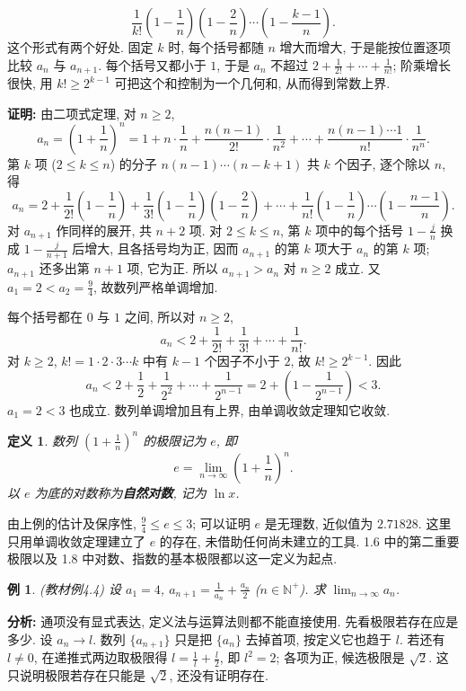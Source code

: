 \documentclass[UTF8,openany]{ctexbook}
\theoremstyle{chinesetextbook}
\newtheorem{definition}{定义}[section]
\newtheorem{example}{例}[section]
\newenvironment{cnproof}{\par\indent\textbf{证明:} \ignorespaces}{\par}
\begin{document}
\[
\frac1{k!}\left(1-\frac1n\right)\left(1-\frac2n\right)\cdots\left(1-\frac{k-1}n\right).
\]
这个形式有两个好处. 固定 $k$ 时, 每个括号都随 $n$ 增大而增大, 于是能按位置逐项比较 $a_n$ 与 $a_{n+1}$. 每个括号又都小于 $1$, 于是 $a_n$ 不超过 $\displaystyle2+\frac1{2!}+\cdots+\frac1{n!}$; 阶乘增长很快, 用 $k!\ge2^{k-1}$ 可把这个和控制为一个几何和, 从而得到常数上界.
\begin{cnproof}
由二项式定理, 对 $n\ge2$,
\[
a_n=\left(1+\frac1n\right)^n
=1+n\cdot\frac1n+\frac{n(n-1)}{2!}\cdot\frac1{n^2}+\cdots+\frac{n(n-1)\cdots1}{n!}\cdot\frac1{n^n}.
\]
第 $k$ 项 ($2\le k\le n$) 的分子 $n(n-1)\cdots(n-k+1)$ 共 $k$ 个因子, 逐个除以 $n$, 得
\[
a_n=2+\frac1{2!}\left(1-\frac1n\right)
+\frac1{3!}\left(1-\frac1n\right)\left(1-\frac2n\right)
+\cdots+\frac1{n!}\left(1-\frac1n\right)\cdots\left(1-\frac{n-1}n\right).
\]
对 $a_{n+1}$ 作同样的展开, 共 $n+2$ 项. 对 $2\le k\le n$, 第 $k$ 项中的每个括号 $\displaystyle1-\frac jn$ 换成 $\displaystyle1-\frac j{n+1}$ 后增大, 且各括号均为正, 因而 $a_{n+1}$ 的第 $k$ 项大于 $a_n$ 的第 $k$ 项; $a_{n+1}$ 还多出第 $n+1$ 项, 它为正. 所以 $a_{n+1}>a_n$ 对 $n\ge2$ 成立. 又 $\displaystyle a_1=2<a_2=\frac94$, 故数列严格单调增加.

每个括号都在 $0$ 与 $1$ 之间, 所以对 $n\ge2$,
\[
a_n<2+\frac1{2!}+\frac1{3!}+\cdots+\frac1{n!}.
\]
对 $k\ge2$, $k!=1\cdot2\cdot3\cdots k$ 中有 $k-1$ 个因子不小于 $2$, 故 $k!\ge2^{k-1}$. 因此
\[
a_n<2+\frac12+\frac1{2^2}+\cdots+\frac1{2^{n-1}}
=2+\left(1-\frac1{2^{n-1}}\right)<3.
\]
$a_1=2<3$ 也成立. 数列单调增加且有上界, 由单调收敛定理知它收敛.
\end{cnproof}
\begin{definition}
数列 $\displaystyle\left(1+\frac1n\right)^n$ 的极限记为 $e$, 即
\[
e=\lim_{n\to\infty}\left(1+\frac1n\right)^n.
\]
以 $e$ 为底的对数称为\textbf{自然对数}, 记为 $\ln x$.
\end{definition}
由上例的估计及保序性, $\displaystyle\frac94\le e\le3$; 可以证明 $e$ 是无理数, 近似值为 $2.71828$. 这里只用单调收敛定理建立了 $e$ 的存在, 未借助任何尚未建立的工具. 1.6 中的第二重要极限以及 1.8 中对数、指数的基本极限都以这一定义为起点.
\begin{example}
\textnormal{(教材例4.4)} 设 $a_1=4$, $\displaystyle a_{n+1}=\frac1{a_n}+\frac{a_n}2$ ($n\in\mathbb N^+$). 求 $\displaystyle\lim_{n\to\infty}a_n$.
\end{example}
\par\indent\textbf{分析:} 通项没有显式表达, 定义法与运算法则都不能直接使用. 先看极限若存在应是多少. 设 $a_n\to l$. 数列 $\{a_{n+1}\}$ 只是把 $\{a_n\}$ 去掉首项, 按定义它也趋于 $l$. 若还有 $l\ne0$, 在递推式两边取极限得 $\displaystyle l=\frac1l+\frac l2$, 即 $l^2=2$; 各项为正, 候选极限是 $\sqrt2$. 这只说明极限若存在只能是 $\sqrt2$, 还没有证明存在.
\end{document}
